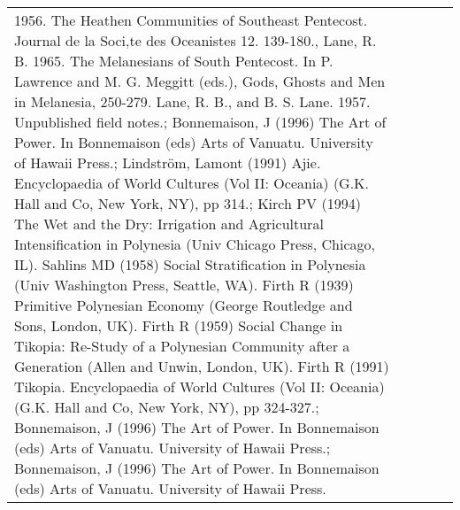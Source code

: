 \begin{longtable}{p{1.8cm}p{1.8cm}p{1.8cm}p{2cm}p{7cm}}
1956. The Heathen Communities of Southeast Pentecost. Journal de la Soci‚te des Oceanistes 12. 139-180., Lane, R. B. 1965. The Melanesians of South Pentecost. In P. Lawrence and M. G. Meggitt (eds.), Gods, Ghosts and Men in Melanesia, 250-279. Lane, R. B., and B. S. Lane. 1957. Unpublished field notes.; Bonnemaison, J (1996) The Art of Power. In Bonnemaison (eds) Arts of Vanuatu. University of Hawaii Press.; Lindström, Lamont (1991) Ajie. Encyclopaedia of World Cultures (Vol II: Oceania) (G.K. Hall and Co, New York, NY), pp 314.; Kirch PV (1994) The Wet and the Dry: Irrigation and Agricultural Intensification in Polynesia (Univ Chicago Press, Chicago, IL). Sahlins MD (1958) Social Stratification in Polynesia (Univ Washington Press, Seattle, WA). Firth R (1939) Primitive Polynesian Economy (George Routledge and Sons, London, UK). Firth R (1959) Social Change in Tikopia: Re-Study of a Polynesian Community after a Generation (Allen and Unwin, London, UK). Firth R (1991) Tikopia. Encyclopaedia of World Cultures (Vol II: Oceania) (G.K. Hall and Co, New York, NY), pp 324-327.; Bonnemaison, J (1996) The Art of Power. In Bonnemaison (eds) Arts of Vanuatu. University of Hawaii Press.; Bonnemaison, J (1996) The Art of Power. In Bonnemaison (eds) Arts of Vanuatu. University of Hawaii Press. \\ 

\end{longtable}
